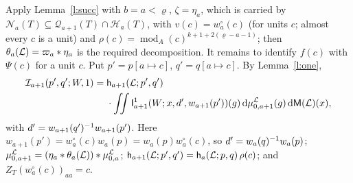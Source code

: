 \documentclass[11pt,a4paper]{article}
\makeatletter
\theoremstyle{plainx}
\theoremstyle{uprightx}
\renewenvironment{proof}[1][Proof]{\par\pushQED{\qed}\normalfont\topsep0pt\partopsep0pt
  \trivlist\item[\hskip\labelsep\itshape #1.]\ignorespaces}{\popQED\endtrivlist\@endpefalse}
\newcommand{\cL}{\mathcal{L}}
\newcommand{\dd}{\mathrm{d}}
\newcommand{\Hl}[2]{\mathcal{H}_{#1}(#2)}
\newcommand{\Ql}[2]{\mathcal{Q}_{#1}(#2)}
\newcommand{\Nf}[2]{\mathcal{N}_{#1}(#2)}
\newcommand{\modA}{\operatorname{mod}_A}
\newcommand{\ZT}[2]{Z_{#1}(#2)}
\newcommand{\wl}[2]{w_{#1}(#2)}
\newcommand{\wo}[2]{w^{\circ}_{#1}(#2)}
\makeatother
\begin{document}
\begin{proof}[Proof of Theorem B]
Apply Lemma~\ref{l:succ} with $b=a<\varrho$, $\zeta=\eta_a$, which is carried by $\Nf{a}{T}\subseteq
\Ql{a+1}{T}\cap\Hl{a}{T}$, with $v(c)=\wo{a}{c}$ (for units $c$; almost every $c$ is a unit) and
$\rho(c)=\modA(c)^{k+1+2(\varrho-a-1)}$; then $\floorMeasure{\cL}{a}=\varpi_a*\eta_a$ is the required
decomposition. It remains to identify $f(c)$ with $\Psi(c)$ for a unit $c$. Put $p'=p[a\mapsto c]$,
$q'=q[a\mapsto c]$. By Lemma~\ref{l:one},
\[\begin{aligned}\floorForm{a+1}{p'}{q'}{W}{1}={}&\headDensity{a+1}{p'}{q'}{\cL}\\
&\cdot\iint\formIntegrandOne{a+1}{W}{x}{d'}{\wl{a+1}{p'}}{g}\,\dd\stackMeasure{\cL}_{0,a+1}(g)\,\dd\groupMeasure{\cL}(x),\end{aligned}\]
with $d'=\weylRatio{a+1}{p'}{q'}$.
Here $\wl{a+1}{p'}=\wo{a}{c}\wl{a}{p}=\wl{a}{p}\wo{a}{c}$, so $d'=\weylRatio{a}{p}{q}$;
$\stackMeasure{\cL}_{0,a+1}=(\eta_a*\floorMeasure{\cL}{a})*\stackMeasure{\cL}_{0,a}$;
$\headDensity{a+1}{p'}{q'}{\cL}=\headDensity{a}{p}{q}{\cL}\,\rho(c)$; and $\ZT{T}{\wo{a}{c}}_{aa}=c$.
\end{proof}
\end{document}
